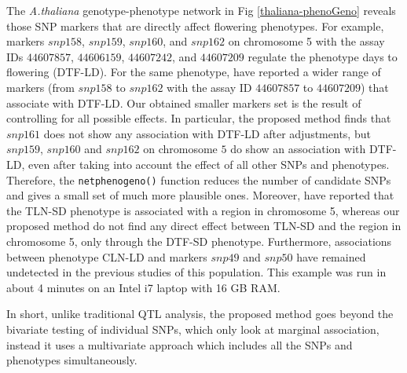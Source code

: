 The \emph{A.thaliana} genotype-phenotype network in Fig \ref{thaliana-phenoGeno} reveals those SNP markers that are directly affect flowering phenotypes. For example, markers $snp158$, $snp159$, $snp160$, and $snp162$ on chromosome 5 with the assay IDs $44607857$, $44606159$, $44607242$, and $44607209$ regulate the phenotype days to flowering (DTF-LD). For the same phenotype, \cite{balasubramanian2009qtl} have reported a wider range of markers (from $snp158$ to $snp162$ with the assay ID $44607857$ to $44607209$) that associate with DTF-LD. Our obtained smaller markers set is the result of controlling for all possible effects. In particular, the proposed method finds that $snp161$ does not show any association with DTF-LD after adjustments, but $snp159$, $snp160$ and $snp162$ on chromosome $5$ do show an association with DTF-LD, even after taking into account the effect of all other SNPs and phenotypes. Therefore, the {\tt netphenogeno()} function reduces the number of candidate SNPs and gives a small set of much more plausible ones. 
Moreover, \cite{balasubramanian2009qtl} have reported that the TLN-SD phenotype is associated with a region in chromosome 5, whereas our proposed method do not find any direct effect between TLN-SD and the region in chromosome 5, only through the DTF-SD phenotype.
Furthermore, associations between phenotype CLN-LD and markers $snp49$ and $snp50$ have remained undetected in the previous studies of this population.  This example was run in about 4 minutes on an Intel i7 laptop with 16 GB RAM. 

In short, unlike traditional QTL analysis, the proposed method goes beyond the bivariate testing of individual SNPs, which only look at marginal association, instead it uses a multivariate approach which includes all the SNPs and phenotypes simultaneously. 


